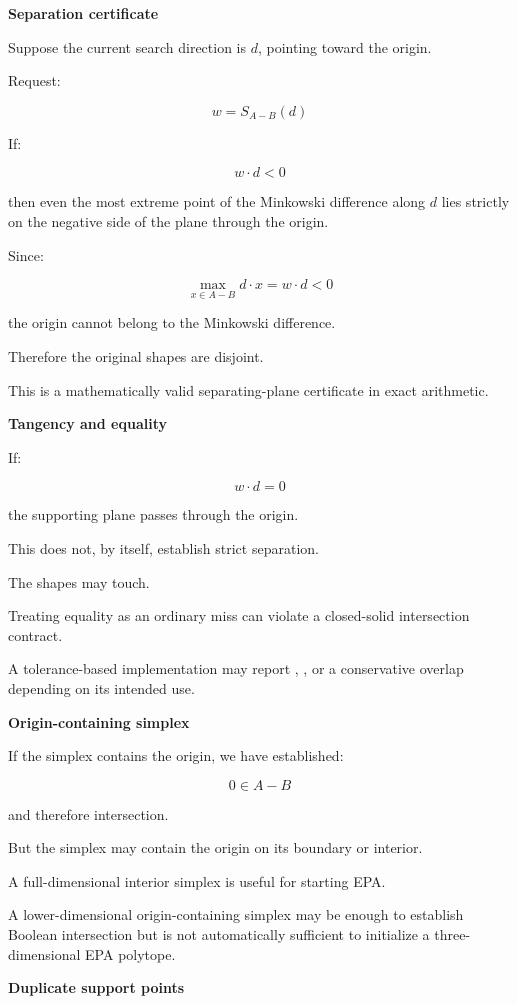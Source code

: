 \textbf{Separation certificate}

Suppose the current search direction is \(d\), pointing toward the origin.

Request:

\[
w=S_{A-B}(d)
\]

If:

\[
\boxed{ w\cdot d<0 }
\]

then even the most extreme point of the Minkowski difference along \(d\) lies strictly on the negative side of the plane through the origin.

Since:

\[
\max_{x\in A-B}d\cdot x=w\cdot d<0
\]

the origin cannot belong to the Minkowski difference.

Therefore the original shapes are disjoint.

This is a mathematically valid separating-plane certificate in exact arithmetic.

\textbf{Tangency and equality}

If:

\[
w\cdot d=0
\]

the supporting plane passes through the origin.

This does not, by itself, establish strict separation.

The shapes may touch.

Treating equality as an ordinary miss can violate a closed-solid intersection contract.

A tolerance-based implementation may report , , or a conservative overlap depending on its intended use.

\textbf{Origin-containing simplex}

If the simplex contains the origin, we have established:

\[
0\in A-B
\]

and therefore intersection.

But the simplex may contain the origin on its boundary or interior.

A full-dimensional interior simplex is useful for starting EPA.

A lower-dimensional origin-containing simplex may be enough to establish Boolean intersection but is not automatically sufficient to initialize a three-dimensional EPA polytope.

\textbf{Duplicate support points}

